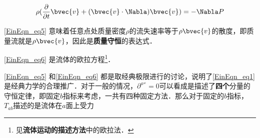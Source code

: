\begin{equation}\label{EinEqn_eq6}
\rho(\frac{\partial}{\partial t}\bvec{v}+(\bvec{v}\cdot\Nabla)\bvec{v})=-\Nabla P
\end{equation}

\autoref{EinEqn_eq5} 意味着任意点处质量密度$\rho$的流失速率等于$\rho\bvec{v}$的散度，即质量流就是$\rho\bvec{v}$，因此是\textbf{质量守恒}的表达式．

\autoref{EinEqn_eq6} 是流体的欧拉方程\footnote{见\textbf{流体运动的描述方法}中的欧拉法．}．

\autoref{EinEqn_eq5} 和\autoref{EinEqn_eq6} 都是取经典极限进行的讨论，说明了\autoref{EinEqn_eq1} 是经典力学的合理推广．对于一般的情况，$\partial^a^_{ab}=0$可以看成是描述了\textbf{四个}分量的守恒定律，即固定$b$指标来考虑，一共有四种固定方法．那么对于固定的$b$指标，$T_{ab}$描述的是流体在$a$面上受力









